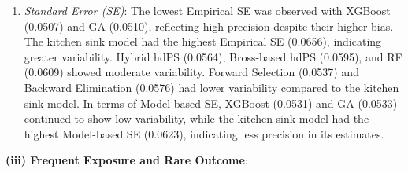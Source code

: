 \documentclass[sn-vancouver,Numbered,lineno,pdflatex]{sn-jnl}
\providecommand{\tightlist}{%
  \setlength{\itemsep}{0pt}\setlength{\parskip}{0pt}}
\begin{document}
\begin{enumerate}
\def\labelenumi{\arabic{enumi}.}
\setcounter{enumi}{3}
\tightlist
\item
  \emph{Standard Error (SE)}: The lowest Empirical SE was observed with
  XGBoost (0.0507) and GA (0.0510), reflecting high precision despite
  their higher bias. The kitchen sink model had the highest Empirical SE
  (0.0656), indicating greater variability. Hybrid hdPS (0.0564),
  Bross-based hdPS (0.0595), and RF (0.0609) showed moderate
  variability. Forward Selection (0.0537) and Backward Elimination
  (0.0576) had lower variability compared to the kitchen sink model. In
  terms of Model-based SE, XGBoost (0.0531) and GA (0.0533) continued to
  show low variability, while the kitchen sink model had the highest
  Model-based SE (0.0623), indicating less precision in its estimates.
\end{enumerate}

\textbf{(iii) Frequent Exposure and Rare Outcome}:
\end{document}
